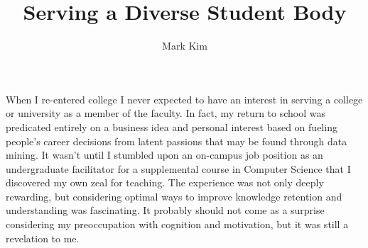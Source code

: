 \documentclass[12pt]{article}
\title{Serving a Diverse Student Body}
\author{Mark Kim}
\begin{document}
\maketitle

When I re-entered college I never expected to have an interest in serving a
college or university as a member of the faculty.  In fact, my return to school was
predicated entirely on a business idea and personal interest based on fueling
people's career decisions from latent passions that may be found through data
mining.  It wasn't until I stumbled upon an on-campus job position as an
undergraduate facilitator for a supplemental course in Computer Science that I
discovered my own zeal for teaching.  The experience was not only deeply
rewarding, but considering optimal ways to improve knowledge retention
and understanding was fascinating.  It probably should not come as a surprise
considering my preoccupation with cognition and motivation, but it was still a
revelation to me.
\end{document}

